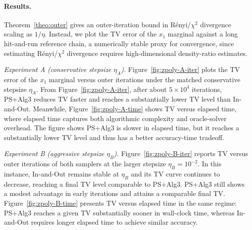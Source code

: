 \documentclass[11pt,letterpaper]{article}
\begin{document}
\paragraph*{Results.}
Theorem~\ref{theo:outer} gives an outer-iteration bound in R\'enyi/$\chi^2$ divergence scaling as $1/\eta$. Instead, we plot the TV error of the $x_1$ marginal against a long hit-and-run reference chain, a numerically stable proxy for convergence, since estimating R\'enyi/$\chi^2$ divergence requires high-dimensional density-ratio estimates.


\emph{Experiment A (conservative stepsize $\eta_A$).}
Figure~\ref{fig:zpoly-A-iter} plots the TV error of the $x_1$ marginal versus outer iterations under the matched conservative stepsize $\eta_A$. From Figure~\ref{fig:zpoly-A-iter}, after about $5\times 10^4$ iterations, PS+Alg3 reduces TV faster and reaches a substantially lower TV level than In-and-Out. Meanwhile, Figure~\ref{fig:zpoly-A-time} shows TV versus elapsed time, where elapsed time captures both algorithmic complexity and oracle-solver overhead. The figure shows PS+Alg3 is slower in elapsed time, but it reaches a substantially lower TV level and thus has a better accuracy-time tradeoff.








\emph{Experiment B (aggressive stepsize $\eta_B$).}
Figure~\ref{fig:zpoly-B-iter} reports TV versus outer iterations of both
samplers at the larger stepsize $\eta_B=10^{-2}$.  In this instance, In-and-Out remains stable at $\eta_B$ and its TV curve
continues to decrease, reaching a final TV level comparable to PS+Alg3. PS+Alg3 still shows a modest
advantage in early iterations and attains a comparable final TV.
Figure~\ref{fig:zpoly-B-time} presents TV versus elapsed time in the same regime:
PS+Alg3 reaches a given TV substantially sooner in wall-clock time, whereas
In-and-Out requires longer elapsed time to achieve similar accuracy. 








\vspace{-1.0em}
\end{document}
